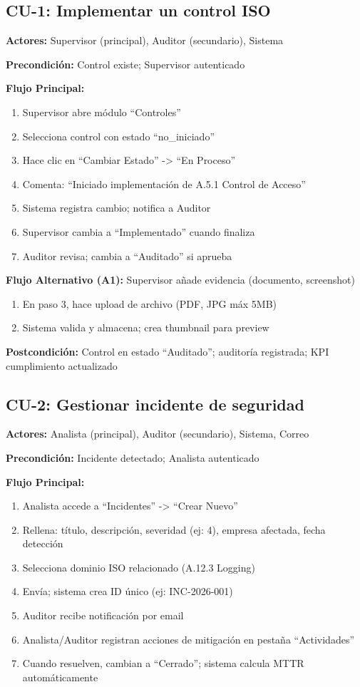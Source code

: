\documentclass[12pt,a4paper,oneside]{article}
\begin{document}
\subsection{CU-1: Implementar un control ISO}

\textbf{Actores:} Supervisor (principal), Auditor (secundario), Sistema

\textbf{Precondición:} Control existe; Supervisor autenticado

\textbf{Flujo Principal:}
\begin{enumerate}
  \item Supervisor abre módulo ``Controles''
  \item Selecciona control con estado ``no\_iniciado''
  \item Hace clic en ``Cambiar Estado'' -> ``En Proceso''
  \item Comenta: ``Iniciado implementación de A.5.1 Control de Acceso''
  \item Sistema registra cambio; notifica a Auditor
  \item Supervisor cambia a ``Implementado'' cuando finaliza
  \item Auditor revisa; cambia a ``Auditado'' si aprueba
\end{enumerate}

\textbf{Flujo Alternativo (A1):} Supervisor añade evidencia (documento, screenshot)
\begin{enumerate}
  \item En paso 3, hace upload de archivo (PDF, JPG máx 5MB)
  \item Sistema valida y almacena; crea thumbnail para preview
\end{enumerate}

\textbf{Postcondición:} Control en estado ``Auditado''; auditoría registrada; KPI cumplimiento actualizado

\subsection{CU-2: Gestionar incidente de seguridad}

\textbf{Actores:} Analista (principal), Auditor (secundario), Sistema, Correo

\textbf{Precondición:} Incidente detectado; Analista autenticado

\textbf{Flujo Principal:}
\begin{enumerate}
  \item Analista accede a ``Incidentes'' -> ``Crear Nuevo''
  \item Rellena: título, descripción, severidad (ej: 4), empresa afectada, fecha detección
  \item Selecciona dominio ISO relacionado (A.12.3 Logging)
  \item Envía; sistema crea ID único (ej: INC-2026-001)
  \item Auditor recibe notificación por email
  \item Analista/Auditor registran acciones de mitigación en pestaña ``Actividades''
  \item Cuando resuelven, cambian a ``Cerrado''; sistema calcula MTTR automáticamente
\end{enumerate}
\end{document}
